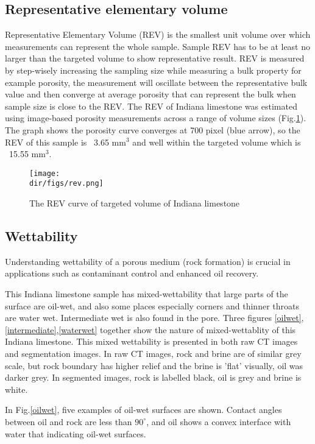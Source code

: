 \subsection{Representative elementary volume}
Representative Elementary Volume (REV) is the smallest unit volume over which measurements can represent the whole sample. Sample REV has to be at least no larger than the targeted volume to show representative result. REV is measured by step-wisely increasing the sampling size while measuring a bulk property for example porosity, the measurement will oscillate between the representative bulk value and then converge at average porosity that can represent the bulk when sample size is close to the REV. The REV of Indiana limestone was estimated using image-based porosity measurements across a range of volume sizes (Fig.\ref{rev}). The graph shows the porosity curve converges at 700 pixel (blue arrow), so the REV of this sample is ~3.65 mm$^3$ and well within the targeted volume which is ~15.55 mm$^3$.

\begin{figure}[htbp]
  \centering
  \texttt{[image: \\dir/figs/rev.png]}
  \caption{The REV curve of targeted volume of Indiana limestone}
  \label{rev}
\end{figure}

\subsection{Wettability}
Understanding wettability of a porous medium (rock formation) is crucial in applications such as contaminant control and enhanced oil recovery.

This Indiana limestone sample has mixed-wettability that large parts of the surface are oil-wet, and also some places especially corners and thinner throats are water wet. Intermediate wet is also found in the pore. Three figures \ref{oilwet},\ref{intermediate},\ref{waterwet} together show the nature of mixed-wettablity of this Indiana limestone. This mixed wettability is presented in both raw CT images and segmentation images. In raw CT images, rock and brine are of similar grey scale, but rock boundary has higher relief and the brine is 'flat' visually, oil was darker grey. In segmented images, rock is labelled black, oil is grey and brine is white. 

In Fig.\ref{oilwet}, five examples of oil-wet surfaces are shown. Contact angles between oil and rock are less than $90^\circ$, and oil shows a convex interface with water that indicating oil-wet surfaces.

